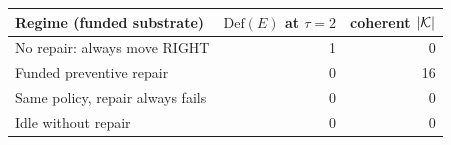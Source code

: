 \begin{tabular}{@{}lrr@{}}
\toprule
Regime (funded substrate) & $\mathrm{Def}(E)$ at $\tau=2$ & coherent $|\mathcal{K}|$ \\
\midrule
No repair: always move RIGHT & 1 & 0 \\
Funded preventive repair & 0 & 16 \\
Same policy, repair always fails & 0 & 0 \\
Idle without repair & 0 & 0 \\
\bottomrule
\end{tabular}
